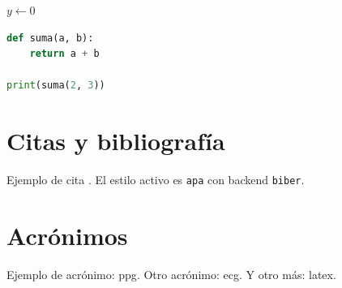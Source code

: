 \begin{algorithm}[H]
  \DontPrintSemicolon
  \caption{Algoritmo de ejemplo}\label{alg:ejemplo}
  $y \leftarrow 0$\;
  \;
\end{algorithm}

\begin{lstlisting}[language=Python,caption={Código de ejemplo en Python},label={lst:ejemplo-codigo}]
def suma(a, b):
    return a + b

print(suma(2, 3))
\end{lstlisting}

\section{Citas y bibliografía}
Ejemplo de cita \parencite{lamport94,knuth1984texbook}. El estilo activo es \texttt{apa} con backend \texttt{biber}.

\section{Acrónimos}
Ejemplo de acrónimo: \gls{ppg}.
Otro acrónimo: \gls{ecg}. Y otro más: \gls{latex}.